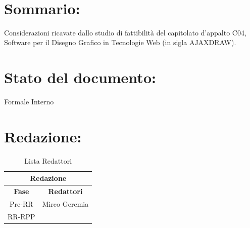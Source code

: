 \newpage

\begin{center} %
	\begin{Huge}	
				\textbf{\TITOLODOC}
			\\
	\end{Huge}
\end{center}

\section*{\LARGE Sommario:} %
\indent \indent
Considerazioni ricavate dallo studio di fattibilit\`a del capitolato d'appalto C04, 
Software per il Disegno Grafico in Tecnologie Web (in sigla AJAXDRAW).


\section*{\LARGE Stato del documento:}
\indent \indent
	Formale Interno

\section*{\LARGE Redazione:}
	\begin{table}[!h]
		\begin{center}
			\begin{tabular}
				{|c|c|}
				\hline
				\multicolumn{2}{|c|}{ \textbf{Redazione} } \\
				\hline
				\textbf{Fase} & \textbf{Redattori} \\
				\hline
				{Pre-RR} & Mirco Geremia \\
				\hline
				{RR-RPP} & \\
				\hline
			\end{tabular}
			\caption{Lista Redattori} %
			\label{tabredazione}
		\end{center}
	\end{table}
	
